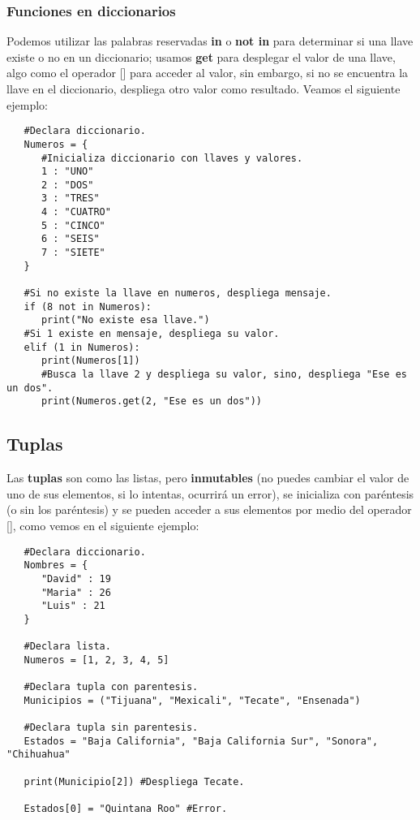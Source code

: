 \subsubsection{Funciones en diccionarios}
\hspace{0.55cm}Podemos utilizar las palabras reservadas \textbf{in} o \textbf{not in} para determinar si una llave existe o no en un diccionario; usamos \textbf{get} para desplegar el valor de una llave, algo como el operador [] para acceder al valor, sin embargo, si no se encuentra la llave en el diccionario, despliega otro valor como resultado. Veamos el siguiente ejemplo:
\begin{lstlisting}
   #Declara diccionario.
   Numeros = {
      #Inicializa diccionario con llaves y valores.
      1 : "UNO"
      2 : "DOS"
      3 : "TRES"
      4 : "CUATRO"
      5 : "CINCO"
      6 : "SEIS"
      7 : "SIETE"
   }
   
   #Si no existe la llave en numeros, despliega mensaje.
   if (8 not in Numeros):
      print("No existe esa llave.")
   #Si 1 existe en mensaje, despliega su valor.
   elif (1 in Numeros):
      print(Numeros[1])
      #Busca la llave 2 y despliega su valor, sino, despliega "Ese es un dos".
      print(Numeros.get(2, "Ese es un dos"))
\end{lstlisting}


\subsection{Tuplas}
\hspace{0.55cm}Las \textbf{tuplas} son como las listas, pero \textbf{inmutables} (no puedes cambiar el valor de uno de sus elementos, si lo intentas, ocurrirá un error), se inicializa con paréntesis (o sin los paréntesis) y se pueden acceder a sus elementos por medio del operador [], como vemos en el siguiente ejemplo:
\begin{lstlisting}
   #Declara diccionario.
   Nombres = {
      "David" : 19
      "Maria" : 26
      "Luis" : 21
   }
   
   #Declara lista.
   Numeros = [1, 2, 3, 4, 5]
   
   #Declara tupla con parentesis.
   Municipios = ("Tijuana", "Mexicali", "Tecate", "Ensenada")
   
   #Declara tupla sin parentesis.
   Estados = "Baja California", "Baja California Sur", "Sonora", "Chihuahua"
   
   print(Municipio[2]) #Despliega Tecate.
   
   Estados[0] = "Quintana Roo" #Error.
\end{lstlisting}

